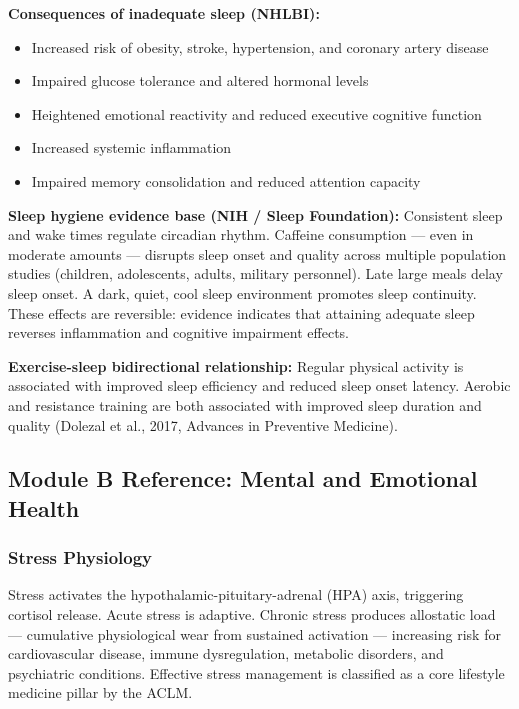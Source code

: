 \documentclass[11pt,letterpaper]{article}
\begin{document}
\textbf{Consequences of inadequate sleep (NHLBI):}
\begin{itemize}[leftmargin=1.5em]
  \item Increased risk of obesity, stroke, hypertension, and coronary artery disease
  \item Impaired glucose tolerance and altered hormonal levels
  \item Heightened emotional reactivity and reduced executive cognitive function
  \item Increased systemic inflammation
  \item Impaired memory consolidation and reduced attention capacity
\end{itemize}

\textbf{Sleep hygiene evidence base (NIH / Sleep Foundation):}
Consistent sleep and wake times regulate circadian rhythm. Caffeine consumption --- even in moderate amounts --- disrupts sleep onset and quality across multiple population studies (children, adolescents, adults, military personnel). Late large meals delay sleep onset. A dark, quiet, cool sleep environment promotes sleep continuity. These effects are reversible: evidence indicates that attaining adequate sleep reverses inflammation and cognitive impairment effects.

\textbf{Exercise-sleep bidirectional relationship:} Regular physical activity is associated with improved sleep efficiency and reduced sleep onset latency. Aerobic and resistance training are both associated with improved sleep duration and quality (Dolezal et al., 2017, Advances in Preventive Medicine).

\subsection{Module B Reference: Mental and Emotional Health}

\subsubsection{Stress Physiology}

Stress activates the hypothalamic-pituitary-adrenal (HPA) axis, triggering cortisol release. Acute stress is adaptive. Chronic stress produces allostatic load --- cumulative physiological wear from sustained activation --- increasing risk for cardiovascular disease, immune dysregulation, metabolic disorders, and psychiatric conditions. Effective stress management is classified as a core lifestyle medicine pillar by the ACLM.
\end{document}
